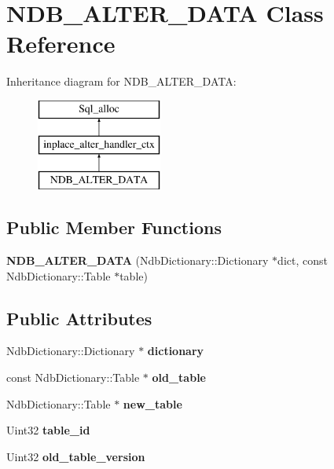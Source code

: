 \hypertarget{classNDB__ALTER__DATA}{}\section{N\+D\+B\+\_\+\+A\+L\+T\+E\+R\+\_\+\+D\+A\+TA Class Reference}
\label{classNDB__ALTER__DATA}
Inheritance diagram for N\+D\+B\+\_\+\+A\+L\+T\+E\+R\+\_\+\+D\+A\+TA\+:\begin{figure}[H]
\begin{center}
\leavevmode
\includegraphics[height=3.000000cm]{classNDB__ALTER__DATA}
\end{center}
\end{figure}
\subsection*{Public Member Functions}
\begin{DoxyCompactItemize}
\item 
\mbox{\label{classNDB__ALTER__DATA_a306c4869c21b9042f09a314403c4f44d}} 
{\bfseries N\+D\+B\+\_\+\+A\+L\+T\+E\+R\+\_\+\+D\+A\+TA} (Ndb\+Dictionary\+::\+Dictionary $\ast$dict, const Ndb\+Dictionary\+::\+Table $\ast$table)
\end{DoxyCompactItemize}
\subsection*{Public Attributes}
\begin{DoxyCompactItemize}
\item 
\mbox{\label{classNDB__ALTER__DATA_a9a6cc976a3956dab949aaf97fd76951b}} 
Ndb\+Dictionary\+::\+Dictionary $\ast$ {\bfseries dictionary}
\item 
\mbox{\label{classNDB__ALTER__DATA_a5419b60ac81a989ab0e3a83384407a1a}} 
const Ndb\+Dictionary\+::\+Table $\ast$ {\bfseries old\+\_\+table}
\item 
\mbox{\label{classNDB__ALTER__DATA_ae70cf7cbb79f38b2deffa1e66986f1cb}} 
Ndb\+Dictionary\+::\+Table $\ast$ {\bfseries new\+\_\+table}
\item 
\mbox{\label{classNDB__ALTER__DATA_ab57eed869f19ba9d11ed6fcbf313bded}} 
Uint32 {\bfseries table\+\_\+id}
\item 
\mbox{\label{classNDB__ALTER__DATA_aae0f799b0931ce3c716e8ec72b9db0b3}} 
Uint32 {\bfseries old\+\_\+table\+\_\+version}
\end{DoxyCompactItemize}
